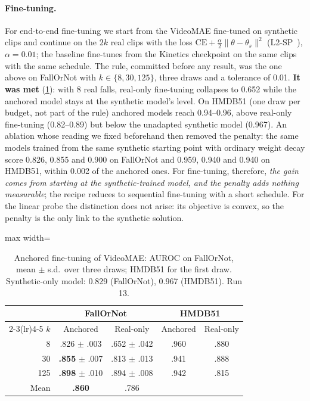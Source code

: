 \documentclass[10pt,twocolumn,letterpaper]{article}
\begin{document}
\paragraph{Fine-tuning.} For end-to-end fine-tuning we start from the VideoMAE fine-tuned on synthetic clips and continue on the $2k$ real clips with the loss $\mathrm{CE}+\tfrac{\alpha}{2}\lVert\theta-\theta_s\rVert^2$ (L2-SP~\cite{li2018l2sp}), $\alpha=0.01$; the baseline fine-tunes from the Kinetics checkpoint on the same clips with the same schedule. The rule, committed before any result, was the one above on FallOrNot with $k\in\{8,30,125\}$, three draws and a tolerance of 0.01. \textbf{It was met} (\cref{tab:anchorft}): with 8 real falls, real-only fine-tuning collapses to 0.652 while the anchored model stays at the synthetic model's level. On HMDB51 (one draw per budget, not part of the rule) anchored models reach 0.94--0.96, above real-only fine-tuning (0.82--0.89) but below the unadapted synthetic model (0.967). An ablation whose reading we fixed beforehand then removed the penalty: the same models trained from the same synthetic starting point with ordinary weight decay score 0.826, 0.855 and 0.900 on FallOrNot and 0.959, 0.940 and 0.940 on HMDB51, within 0.002 of the anchored ones. For fine-tuning, therefore, \emph{the gain comes from starting at the synthetic-trained model, and the penalty adds nothing measurable}; the recipe reduces to sequential fine-tuning with a short schedule. For the linear probe the distinction does not arise: its objective is convex, so the penalty is the only link to the synthetic solution.

\begin{table}[t]\centering\small
\caption{Anchored fine-tuning of VideoMAE: AUROC on FallOrNot, mean $\pm$ s.d.\ over three draws; HMDB51 for the first draw. Synthetic-only model: 0.829 (FallOrNot), 0.967 (HMDB51). Run 13.}
\label{tab:anchorft}
\setlength\tabcolsep{3pt}
\begin{adjustbox}{max width=\linewidth}
\begin{tabular}{rcccc}\toprule
 & \multicolumn{2}{c}{FallOrNot} & \multicolumn{2}{c}{HMDB51}\\\cmidrule(lr){2-3}\cmidrule(lr){4-5}
$k$ & Anchored & Real-only & Anchored & Real-only\\\midrule
8 & .826 $\pm$ .003 & .652 $\pm$ .042 & .960 & .880\\
30 & \textbf{.855} $\pm$ .007 & .813 $\pm$ .013 & .941 & .888\\
125 & \textbf{.898} $\pm$ .010 & .894 $\pm$ .008 & .942 & .815\\\midrule
Mean & \textbf{.860} & .786 & & \\\bottomrule
\end{tabular}
\end{adjustbox}
\end{table}
\end{document}
